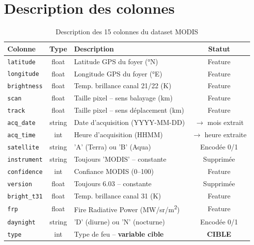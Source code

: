 \documentclass[12pt,a4paper]{report}
\begin{document}
\section{Description des colonnes}

\begin{table}[H]
\centering
\small
\begin{tabular}{|l|c|p{5cm}|c|}
\hline
\rowcolor{bleu!15}
\textbf{Colonne} & \textbf{Type} & \textbf{Description} & \textbf{Statut} \\
\hline
\texttt{latitude} & float & Latitude GPS du foyer (°N) & Feature \\
\hline
\texttt{longitude} & float & Longitude GPS du foyer (°E) & Feature \\
\hline
\texttt{brightness} & float & Temp. brillance canal 21/22 (K) & Feature \\
\hline
\texttt{scan} & float & Taille pixel -- sens balayage (km) & Feature \\
\hline
\texttt{track} & float & Taille pixel -- sens d\'{e}placement (km) & Feature \\
\hline
\texttt{acq\_date} & string & Date d'acquisition (YYYY-MM-DD) & $\rightarrow$ mois extrait \\
\hline
\texttt{acq\_time} & int & Heure d'acquisition (HHMM) & $\rightarrow$ heure extraite \\
\hline
\texttt{satellite} & string & 'A' (Terra) ou 'B' (Aqua) & Encod\'{e}e 0/1 \\
\hline
\texttt{instrument} & string & Toujours 'MODIS' -- constante & \textcolor{rouge}{Supprim\'{e}e} \\
\hline
\texttt{confidence} & int & Confiance MODIS (0--100) & Feature \\
\hline
\texttt{version} & float & Toujours 6.03 -- constante & \textcolor{rouge}{Supprim\'{e}e} \\
\hline
\texttt{bright\_t31} & float & Temp. brillance canal 31 (K) & Feature \\
\hline
\texttt{frp} & float & Fire Radiative Power (MW/sr/m\textsuperscript{2}) & Feature \\
\hline
\texttt{daynight} & string & 'D' (diurne) ou 'N' (nocturne) & Encod\'{e}e 0/1 \\
\hline
\texttt{type} & int & Type de feu -- \textbf{variable cible} & \textbf{CIBLE} \\
\hline
\end{tabular}
\caption{Description des 15 colonnes du dataset MODIS}
\label{tab:colonnes}
\end{table}
\end{document}
